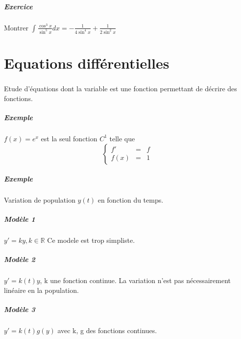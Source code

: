 \paragraph{Exercice}  Montrer $\int\frac{\cos^3 x}{\sin^5 x} dx = - \frac{1}{4 \sin^4 x} + \frac{1}{2\sin^2 x}$

\chapter{Equations différentielles}

\paragraph{} Etude d'équations dont la variable est une fonction permettant de décrire des fonctions.
\paragraph{Exemple} $f(x) = e^x$ est la seul fonction $C^1$ telle que \[\left\{\begin{array}{rcl}
	f' &=& f \\
	f(x) &=& 1 \end{array}\right.\]

\paragraph{Exemple} Variation de population $y(t)$ en fonction du temps.

\paragraph{Modèle 1} $y' = ky, k \in \mathbb{R}$ Ce modele est trop simpliste.
\paragraph{Modèle 2} $y' = k(t) y$, k une fonction continue. La variation n'est pas nécessairement linéaire en la population.
\paragraph{Modèle 3} $y' = k(t)g(y)$ avec k, g des fonctions continues. 
